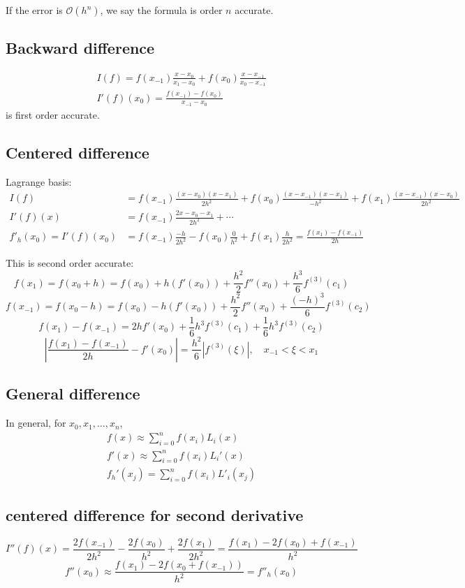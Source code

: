 \documentclass[11pt]{article}
\begin{document}
\begin{definition}
    If the error is $\mathcal{O}(h^n)$, we say the formula is order $n$ accurate.
\end{definition}

\subsection{Backward difference}
\begin{align*}
    I(f) = f(x_{-1})\frac{x-x_0}{x_1 - x_0} + f(x_0) \frac{x-x_{-1}}{x_0 - x_{-1}} \\
    I'(f)(x_0) = \frac{f(x_{-1}) - f(x_0)}{x_{-1}-x_0}
\end{align*}
is first order accurate.
\subsection{Centered difference}
Lagrange basis:
\begin{align*}
    I(f) &= f(x_{-1})\frac{(x-x_0)(x-x_1)}{2h^2} + f(x_0) \frac{(x-x_{-1})(x-x_1)}{-h^2} + f(x_1)\frac{(x-x_{-1})(x-x_0)}{2h^2} \\
    I'(f)(x) &= f(x_{-1})\frac{2x-x_0-x_1}{2h^2} + \cdots\\
    f'_h(x_0) = I'(f)(x_0) &= f(x_{-1})\frac{-h}{2h^2} - f(x_0) \frac{0}{h^2} +f(x_1)\frac{h}{2h^2}= \frac{f(x_1)-f(x_{-1})}{2h}
\end{align*}

This is second order accurate:
\[
    f(x_1)=f(x_0+h)=f(x_0)+h(f'(x_0))+\frac{h^2}{2}f''(x_0)+\frac{h^3}{6}f^{(3)}(c_1)
\]
\[
    f(x_{-1})=f(x_0-h)=f(x_0)-h(f'(x_0))+\frac{h^2}{2}f''(x_0)+\frac{(-h)^3}{6}f^{(3)}(c_2)
\]
\[
    f(x_1) - f(x_{-1}) = 2hf'(x_0) + \frac{1}{6}h^3 f^{(3)}(c_1) + \frac{1}{6}h^3f^{(3)}(c_2)
\]
\[
    |\frac{f(x_1)-f(x_{-1})}{2h} - f'(x_0)| = \frac{h^2}{6}|f^{(3)}(\xi)|, \quad x_{-1} < \xi < x_1
\]

\subsection{General difference}
In general, for $x_0, x_1, \dots, x_n$, 
\begin{align*} 
    f(x) \approx \sum_{i=0}^{n } f(x_i)L_i(x) \\
    f'(x) \approx \sum_{i=0}^{n} f(x_i)L_i'(x) \\
    f_h'(x_j) = \sum_{i=0}^{n} f(x_i) L'_i(x_j) 
\end{align*}

\subsection{centered difference for second derivative}
\[
    I''(f)(x) = \frac{2f(x_{-1})}{2h^2}-\frac{2f(x_0)}{h^2}+\frac{2f(x_1)}{2h^2} = \frac{f(x_1)-2f(x_0)+f(x_{-1})}{h^2}
\]
\[
    f''(x_0) \approx \frac{f(x_1) - 2f(x_0 + f(x_{-1}))}{h^2}=f''_h(x_0)
\]
\end{document}
